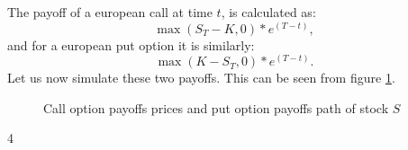 \documentclass[a4paper, 12pt]{article}
\theoremstyle{definition}
\theoremstyle{plain}
\theoremstyle{definition}
\begin{document}
The payoff of a european call at time $t$, is 
calculated as: 
$$ 
\max (S_T - K, 0) * e^(T-t), 
$$
and for a european put option it is similarly:
$$ 
\max (K - S_T, 0) * e^(T-t). 
$$
Let us now simulate these two payoffs.
This can be seen from figure \ref{fig:option_payoff}.

\begin{figure}[ht!]
    \centering

    \caption{Call option payoffs prices 
            and put option payoffs path of stock $S$}
 \label{fig:option_payoff}
 \end{figure}4
\end{document}
